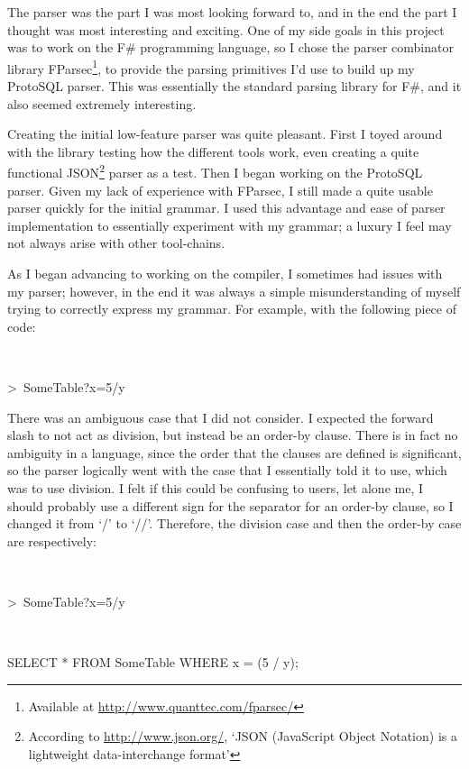 \documentclass[titlepage]{article}
\begin{document}
			The parser was the part I was most looking forward to, and in the end the part I thought was most interesting and exciting.  One of my side goals in this project was to work on the F\# programming language, so I chose the parser combinator library FParsec\footnote{Available at \url{http://www.quanttec.com/fparsec/}}, to provide the parsing primitives I'd use to build up my ProtoSQL parser.  This was essentially the standard parsing library for F\#, and it also seemed extremely interesting.

			Creating the initial low-feature parser was quite pleasant.  First I toyed around with the library testing how the different tools work, even creating a quite functional JSON\footnote{According to \url{http://www.json.org/}, `JSON (JavaScript Object Notation) is a lightweight data-interchange format'} parser as a test.  Then I began working on the ProtoSQL parser.  Given my lack of experience with FParsec, I still made a quite usable parser quickly for the initial grammar.  I used this advantage and ease of parser implementation to essentially experiment with my grammar; a luxury I feel may not always arise with other tool-chains.

			As I began advancing to working on the compiler, I sometimes had issues with my parser; however, in the end it was always a simple misunderstanding of myself trying to correctly express my grammar.  For example, with the following piece of code:
			\newline

			~\centerline{\textgreater\ SomeTable?x=5/y}
			\newline

			There was an ambiguous case that I did not consider.  I expected the forward slash to not act as division, but instead be an order-by clause.  There is in fact no ambiguity in a language, since the order that the clauses are defined is significant, so the parser logically went with the case that I essentially told it to use, which was to use division.  I felt if this could be confusing to users, let alone me, I should probably use a different sign for the separator for an order-by clause, so I changed it from `/' to `//'.  Therefore, the division case and then the order-by case are respectively:
			\newline

			~\centerline{\textgreater\ SomeTable?x=5/y}
			~\centerline{SELECT * FROM SomeTable WHERE x = (5 / y);}
			\newline
\end{document}
